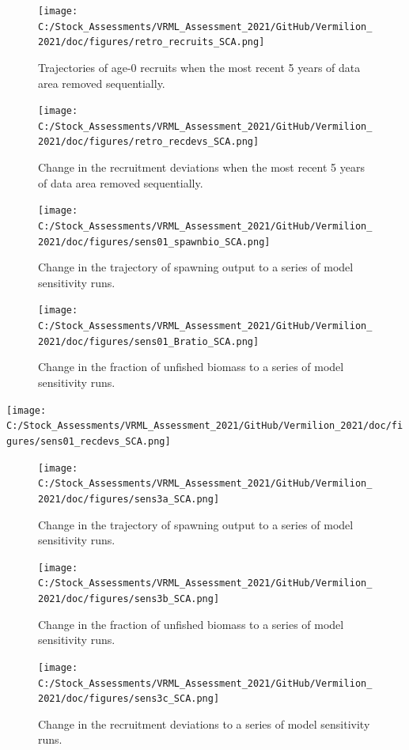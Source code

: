 \documentclass[
  english,
  a4paper,
]{article}
\begin{document}
\begin{figure}
\centering
\texttt{[image: C:/Stock\_Assessments/VRML\_Assessment\_2021/GitHub/Vermilion\_2021/doc/figures/retro\_recruits\_SCA.png]}
\caption{Trajectories of age-0 recruits when the most recent 5 years of data area removed sequentially.\label{fig:retro-recruits}}
\end{figure}

\begin{figure}
\centering
\texttt{[image: C:/Stock\_Assessments/VRML\_Assessment\_2021/GitHub/Vermilion\_2021/doc/figures/retro\_recdevs\_SCA.png]}
\caption{Change in the recruitment deviations when the most recent 5 years of data area removed sequentially.\label{fig:retro-recdevs}}
\end{figure}

\begin{figure}
\centering
\texttt{[image: C:/Stock\_Assessments/VRML\_Assessment\_2021/GitHub/Vermilion\_2021/doc/figures/sens01\_spawnbio\_SCA.png]}
\caption{Change in the trajectory of spawning output to a series of model sensitivity runs.\label{fig:sens1-spawnb}}
\end{figure}

\begin{figure}
\centering
\texttt{[image: C:/Stock\_Assessments/VRML\_Assessment\_2021/GitHub/Vermilion\_2021/doc/figures/sens01\_Bratio\_SCA.png]}
\caption{Change in the fraction of unfished biomass to a series of model sensitivity runs.\label{fig:sens1-bratio}}
\end{figure}

\texttt{[image: C:/Stock\_Assessments/VRML\_Assessment\_2021/GitHub/Vermilion\_2021/doc/figures/sens01\_recdevs\_SCA.png]}

\begin{figure}
\centering
\texttt{[image: C:/Stock\_Assessments/VRML\_Assessment\_2021/GitHub/Vermilion\_2021/doc/figures/sens3a\_SCA.png]}
\caption{Change in the trajectory of spawning output to a series of model sensitivity runs.\label{fig:sens3a}}
\end{figure}

\begin{figure}
\centering
\texttt{[image: C:/Stock\_Assessments/VRML\_Assessment\_2021/GitHub/Vermilion\_2021/doc/figures/sens3b\_SCA.png]}
\caption{Change in the fraction of unfished biomass to a series of model sensitivity runs.\label{fig:sens3b}}
\end{figure}

\begin{figure}
\centering
\texttt{[image: C:/Stock\_Assessments/VRML\_Assessment\_2021/GitHub/Vermilion\_2021/doc/figures/sens3c\_SCA.png]}
\caption{Change in the recruitment deviations to a series of model sensitivity runs.\label{fig:sens3c}}
\end{figure}
\end{document}
